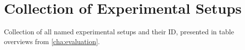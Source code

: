 \chapter{Collection of Experimental Setups}
\label{app:exp_overviews}
Collection of all named experimental setups and their ID, presented in table overviews from \autoref{cha:evaluation}.

\begin{table}[ht]
    \myfloatalign
    
\end{table}

\begin{table}[ht]
    \myfloatalign
    
\end{table}

\begin{table}[ht]
    \myfloatalign
    
\end{table}

\begin{table}[ht]
    \myfloatalign
    
\end{table}

\begin{table}[ht]
    \myfloatalign
    
\end{table}


\begin{table}[ht]
    \myfloatalign
    
\end{table}

\begin{table}[ht]
    \myfloatalign
    
\end{table}

\begin{table}[ht]
    \myfloatalign
    
\end{table}


\begin{table}[ht]
    \myfloatalign
    
\end{table}